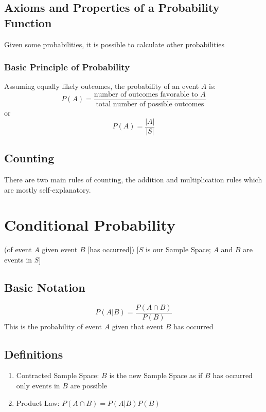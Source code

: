 \documentclass[12pt]{article}
\begin{document}
        \subsection{Axioms and Properties of a Probability Function}
            Given some probabilities, it is possible to calculate other probabilities
            \subsubsection{Basic Principle of Probability}
                Assuming equally likely outcomes, the probability of an event $A$ is:
                \begin{equation}
                    P(A) = \frac{\text{number of outcomes favorable to } A}{\text{total number of possible outcomes}}
                \end{equation}
                or
                \begin{equation}
                    P(A) = \frac{|A|}{|S|}
                \end{equation}
        \subsection{Counting}
            There are two main rules of counting, the addition and multiplication rules which are mostly self-explanatory.
    \section{Conditional Probability}
        (of event $A$ given event $B$ [has occurred])
        [$S$ is our Sample Space; $A$ and $B$ are events in $S$]
        \subsection{Basic Notation}
            \begin{equation}
                P(A|B) = \frac{P(A \cap B)}{P(B)}
            \end{equation}
            This is the probability of event $A$ given that event $B$ has occurred
        \subsection{Definitions}
            \begin{enumerate}
                \item Contracted Sample Space: $B$ is the new Sample Space as if $B$ has occurred only events in $B$ are possible
                \item Product Law: $P(A \cap B) = P(A|B)P(B)$
            \end{enumerate}
\end{document}
